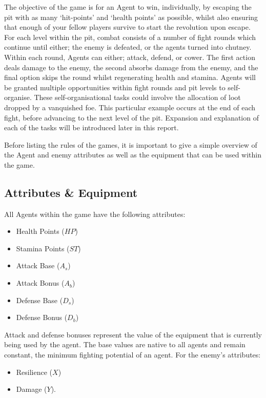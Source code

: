 The objective of the game is for an Agent to win, individually, by escaping the pit with as many `hit-points' and `health points' as possible, whilst also ensuring that enough of your fellow players survive to start the revolution upon escape. 
For each level within the pit, combat consists of a number of fight rounds which continue until either; the enemy is defeated, or the agents turned into chutney. Within each round, Agents can either; attack, defend, or cower. The first action deals damage to the enemy, the second absorbs damage from the enemy, and the final option skips the round whilst regenerating health and stamina.
Agents will be granted multiple opportunities within fight rounds and pit levels to self-organise. These self-organisational tasks could involve the allocation of loot dropped by a vanquished foe. This particular example occurs at the end of each fight, before advancing to the next level of the pit. Expansion and explanation of each of the tasks will be introduced later in this report. 

Before listing the rules of the games, it is important to give a simple overview of the Agent and enemy attributes as well as the equipment that can be used within the game.  

\subsection{Attributes \& Equipment}

All Agents within the game have the following attributes:

\begin{itemize} 
    \item Health Points ($HP$)
    \item Stamina Points ($ST$)
    \item Attack Base ($A_s$)
    \item Attack Bonus ($A_b$)
    \item Defense Base ($D_s$)
    \item Defense Bonus ($D_b$)
\end{itemize}

Attack and defense bonuses represent the value of the equipment that is currently being used by the agent. The base values are native to all agents and remain constant, the minimum fighting potential of an agent. For the enemy's attributes:

\begin{itemize}
    \item Resilience ($X$)
    \item Damage ($Y$).
\end{itemize}

